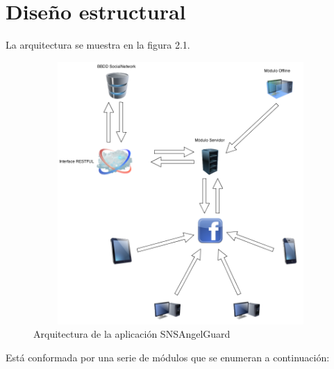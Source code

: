 \section{Diseño estructural}
La arquitectura se muestra en la figura 2.1. 
\bigskip
\par
\begin{figure}
\begin{center}
\includegraphics[width=12cm,height=10cm]{Figuras/ArchitectureSNS.png}
\end{center}
\caption{\label{Arquitectura} Arquitectura de la aplicación SNSAngelGuard}
\end{figure}
\bigskip
\par
Está conformada por una serie de módulos que se enumeran a continuación:
